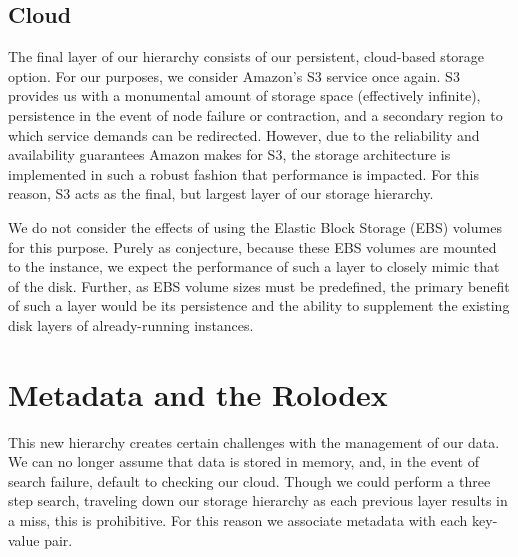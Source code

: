 \subsection{Cloud} %
\label{sub:storage_cloud}
The final layer of our hierarchy consists of our persistent, cloud-based
storage option. For our purposes, we consider Amazon's S3 service once again.
S3 provides us with a monumental amount of storage space (effectively
infinite), persistence in the event of node failure or contraction, and a
secondary region to which service demands can be redirected. However, due to
the reliability and availability guarantees Amazon makes for S3, the storage
architecture is implemented in such a robust fashion that performance is
impacted. For this reason, S3 acts as the final, but largest layer of our
storage hierarchy.

We do not consider the effects of using the Elastic Block Storage (EBS) volumes
for this purpose. Purely as conjecture, because these EBS volumes are mounted
to the instance, we expect the performance of such a layer to closely mimic
that of the disk. Further, as EBS volume sizes must be predefined, the primary
benefit of such a layer would be its persistence and the ability to supplement
the existing disk layers of already-running instances.


\section{Metadata and the Rolodex} %
\label{sec:rolodex}
This new hierarchy creates certain challenges with the management of our data.
We can no longer assume that data is stored in memory, and, in the event of
search failure, default to checking our cloud. Though we could perform a three
step search, traveling down our storage hierarchy as each previous layer
results in a miss, this is prohibitive. For this reason we associate metadata
with each key-value pair.

